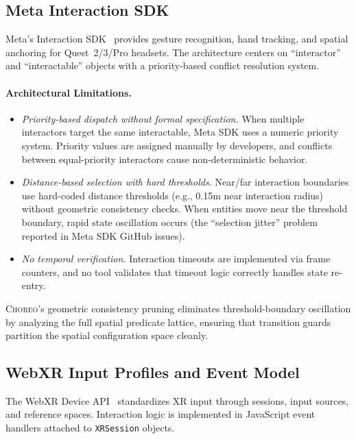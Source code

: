 \documentclass[11pt,a4paper]{article}
\begin{document}
\subsection{Meta Interaction SDK}

Meta's Interaction SDK~\cite{meta2023} provides gesture recognition, hand tracking,
and spatial anchoring for Quest~2/3/Pro headsets.
The architecture centers on ``interactor'' and ``interactable'' objects with a
priority-based conflict resolution system.

\paragraph{Architectural Limitations.}
\begin{itemize}
\item \emph{Priority-based dispatch without formal specification.}
  When multiple interactors target the same interactable, Meta SDK uses a
  numeric priority system.
  Priority values are assigned manually by developers, and conflicts between
  equal-priority interactors cause non-deterministic behavior.
\item \emph{Distance-based selection with hard thresholds.}
  Near/far interaction boundaries use hard-coded distance thresholds
  (e.g., 0.15m near interaction radius) without geometric consistency checks.
  When entities move near the threshold boundary, rapid state oscillation occurs
  (the ``selection jitter'' problem reported in Meta SDK GitHub issues).
\item \emph{No temporal verification.}
  Interaction timeouts are implemented via frame counters, and no tool validates
  that timeout logic correctly handles state re-entry.
\end{itemize}

\textsc{Choreo}'s geometric consistency pruning eliminates threshold-boundary
oscillation by analyzing the full spatial predicate lattice, ensuring that
transition guards partition the spatial configuration space cleanly.

\subsection{WebXR Input Profiles and Event Model}

The WebXR Device API~\cite{webxr2023} standardizes XR input through sessions,
input sources, and reference spaces.
Interaction logic is implemented in JavaScript event handlers attached to
\texttt{XRSession} objects.
\end{document}
